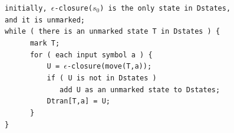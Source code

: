 \noindent
\verb|initially, |$\epsilon$\verb|-closure(|$s_0$\verb|) is the only state in Dstates,|\\
\verb|and it is unmarked;|\\
\verb|while ( there is an unmarked state T in Dstates ) {|\\
\verb|      mark T;|\\
\verb|      for ( each input symbol a ) {|\\
\verb|          U = |$\epsilon$\verb|-closure(move(T,a));|\\
\verb|          if ( U is not in Dstates )|\\
\verb|             add U as an unmarked state to Dstates;|\\
\verb|          Dtran[T,a] = U;|\\
\verb|      }|\\
\verb|}|
